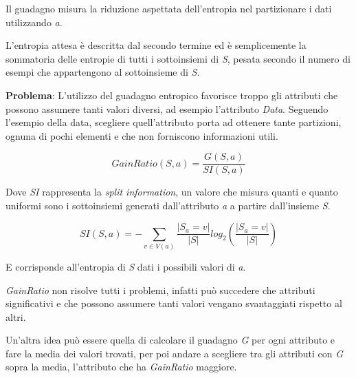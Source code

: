 Il guadagno misura la riduzione aspettata dell'entropia nel partizionare
i dati utilizzando \emph{a}.

L'entropia attesa è descritta dal secondo termine ed è semplicemente la
sommatoria delle entropie di tutti i sottoinsiemi di \emph{S}, pesata
secondo il numero di esempi che appartengono al sottoinsieme di
\emph{S}.

\textbf{Problema}: L'utilizzo del guadagno entropico favorisce troppo
gli attributi che possono assumere tanti valori diversi, ad esempio
l'attributo \emph{Data}. Seguendo l'esempio della data, scegliere
quell'attributo porta ad ottenere tante partizioni, ognuna di pochi
elementi e che non forniscono informazioni utili.

$$
GainRatio(S, a) = \frac{G(S, a)}{SI(S,a)}
$$

Dove \emph{SI} rappresenta la \emph{split information}, un valore che
misura quanti e quanto uniformi sono i sottoinsiemi generati
dall'attributo \emph{a} a partire dall'insieme \emph{S}.

$$
SI(S,a) = - \sum_{v \in V(a)}\frac{|S_a = v|}{|S|} log_2(\frac{|S_a = v|}{|S|})
$$

E corrisponde all'entropia di \emph{S} dati i possibili valori di
\emph{a}.

\emph{GainRatio} non risolve tutti i problemi, infatti può succedere che
attributi significativi e che possono assumere tanti valori vengano
svantaggiati rispetto al altri.

Un'altra idea può essere quella di calcolare il guadagno \emph{G} per ogni
attributo e fare la media dei valori trovati, per poi andare a
scegliere tra gli attributi con \emph{G} sopra la media,
l'attributo che ha \emph{GainRatio} maggiore.
